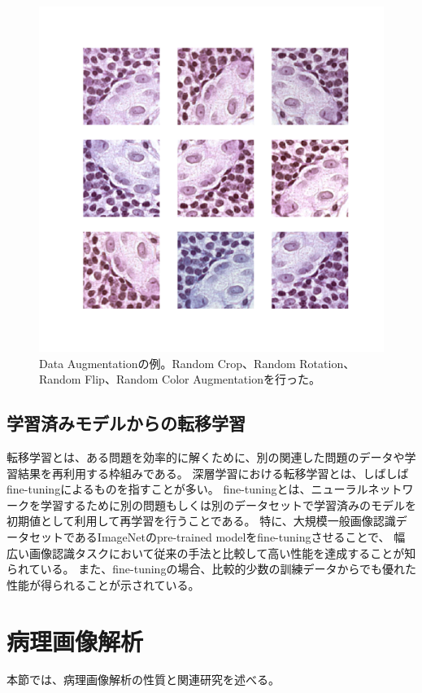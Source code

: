 \begin{figure}[tbp]
     \begin{center}
      \includegraphics[width=12cm]{figures/data_augmentation.pdf}
     \end{center}
    \caption{\label{fig:data_augmentation}Data Augmentationの例。Random Crop、Random Rotation、Random Flip、Random Color Augmentationを行った。}
\end{figure}

\subsection{学習済みモデルからの転移学習}
\label{sec:transfer}
転移学習とは、ある問題を効率的に解くために、別の関連した問題のデータや学習結果を再利用する枠組みである。
深層学習における転移学習とは、しばしばfine-tuningによるものを指すことが多い。
fine-tuningとは、ニューラルネットワークを学習するために別の問題もしくは別のデータセットで学習済みのモデルを初期値として利用して再学習を行うことである。
特に、大規模一般画像認識データセットであるImageNet\cite{imagenet_cvpr09}のpre-trained modelをfine-tuningさせることで、
幅広い画像認識タスクにおいて従来の手法と比較して高い性能を達成することが知られている\cite{girshick2014rich, agrawal2014analyzing}。
また、fine-tuningの場合、比較的少数の訓練データからでも優れた性能が得られることが示されている。

\section{病理画像解析}
本節では、病理画像解析の性質と関連研究を述べる。

